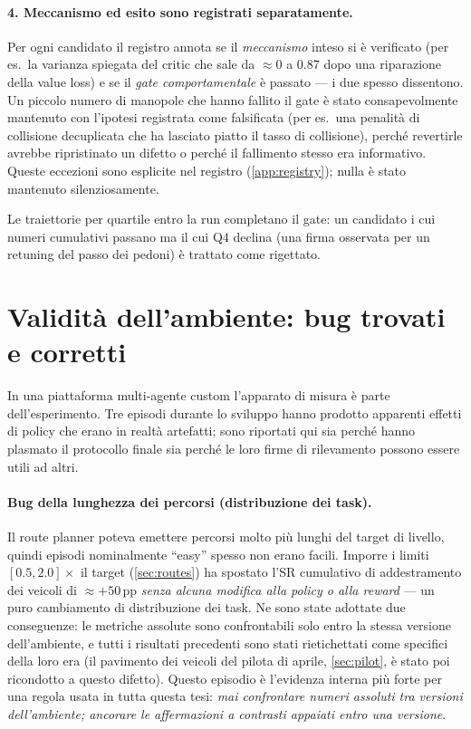 \paragraph{4. Meccanismo ed esito sono registrati separatamente.}
Per ogni candidato il registro annota se il \emph{meccanismo} inteso si
è verificato (per es.\ la varianza spiegata del critic che sale da
$\approx 0$ a $0.87$ dopo una riparazione della value loss) e se il
\emph{gate comportamentale} è passato --- i due spesso dissentono. Un
piccolo numero di manopole che hanno fallito il gate è stato
consapevolmente mantenuto con l'ipotesi registrata come falsificata
(per es.\ una penalità di collisione decuplicata che ha lasciato piatto
il tasso di collisione), perché revertirle avrebbe ripristinato un
difetto o perché il fallimento stesso era informativo. Queste eccezioni
sono esplicite nel registro (\cref{app:registry}); nulla è stato
mantenuto silenziosamente.

Le traiettorie per quartile entro la run completano il gate: un
candidato i cui numeri cumulativi passano ma il cui Q4 declina (una
firma osservata per un retuning del passo dei pedoni) è trattato come
rigettato.

\section{Validità dell'ambiente: bug trovati e corretti}
\label{sec:bugs}

In una piattaforma multi-agente custom l'apparato di misura è parte
dell'esperimento. Tre episodi durante lo sviluppo hanno prodotto
apparenti effetti di policy che erano in realtà artefatti; sono
riportati qui sia perché hanno plasmato il protocollo finale sia perché
le loro firme di rilevamento possono essere utili ad altri.

\paragraph{Bug della lunghezza dei percorsi (distribuzione dei task).}
Il route planner poteva emettere percorsi molto più lunghi del target di
livello, quindi episodi nominalmente ``easy'' spesso non erano facili.
Imporre i limiti $[0.5, 2.0]\times$ il target (\cref{sec:routes}) ha
spostato l'SR cumulativo di addestramento dei veicoli di $\approx
+50$\,pp \emph{senza alcuna modifica alla policy o alla reward} --- un
puro cambiamento di distribuzione dei task. Ne sono state adottate due
conseguenze: le metriche assolute sono confrontabili solo entro la
stessa versione dell'ambiente, e tutti i risultati precedenti sono stati
rietichettati come specifici della loro era (il pavimento dei veicoli
del pilota di aprile, \cref{sec:pilot}, è stato poi ricondotto a questo
difetto). Questo episodio è l'evidenza interna più forte per una regola
usata in tutta questa tesi: \emph{mai confrontare numeri assoluti tra
versioni dell'ambiente; ancorare le affermazioni a contrasti appaiati
entro una versione}.

